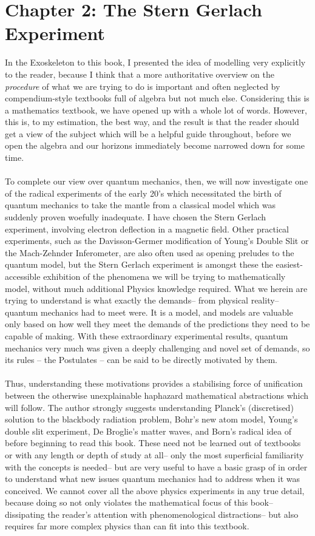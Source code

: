 \chapter{Chapter 2: The Stern Gerlach Experiment}
In the Exoskeleton to this book, I presented the idea of modelling very explicitly to the reader, because I think that a more authoritative overview on the \emph{procedure} of what we are trying to do is important and often neglected by compendium-style textbooks full of algebra but not much else. Considering this is a mathematics textbook, we have opened up with a whole lot of words. However, this is, to my estimation, the best way, and the result is that the reader should get a  view of the subject which will be a helpful guide throughout, before we open the algebra and our horizons immediately become narrowed down for some time.
\\\\
To complete our  view over quantum mechanics, then, we will now investigate one of the radical experiments of the early 20's which necessitated the birth of quantum mechanics to take the mantle from a classical model which was suddenly proven woefully inadequate. I have chosen the Stern Gerlach experiment, involving electron deflection in a magnetic field. Other practical experiments, such as the Davisson-Germer modification of Young's Double Slit or the Mach-Zehnder Inferometer, are also often used as opening preludes to the quantum model, but the Stern Gerlach experiment is amongst these the easiest-accessible exhibition of the phenomena we will be trying to mathematically model, without much additional Physics knowledge required. What we herein are trying to understand is what exactly the demands-- from physical reality-- quantum mechanics had to meet were. It is a model, and models are valuable only based on how well they meet the demands of the predictions they need to be capable of making. With these extraordinary experimental results, quantum mechanics very much was given a deeply challenging and novel set of demands, so its rules -- the Postulates -- can be said to be directly motivated by them.
\\\\
Thus, understanding these motivations provides a stabilising force of unification between the otherwise unexplainable haphazard mathematical abstractions which will follow. The author strongly suggests understanding Planck's (discretised) solution to the blackbody radiation problem, Bohr's new atom model, Young's double slit experiment, De Broglie's matter waves, and Born's radical idea of  before beginning to read this book. These need not be learned out of textbooks or with any length or depth of study at all-- only the most superficial familiarity with the concepts is needed-- but are very useful to have a basic grasp of in order to understand what new issues quantum mechanics had to address when it was conceived. We cannot cover all the above physics experiments in any true detail, because doing so not only violates the mathematical focus of this book-- dissipating the reader's attention with phenomenological distractions-- but also requires far more complex physics than can fit into this textbook. 
